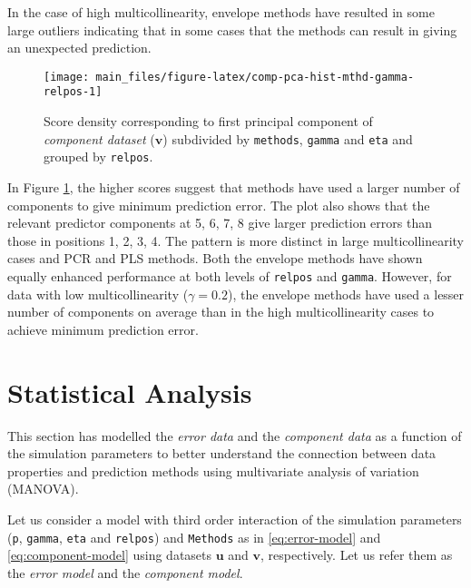 \documentclass[review]{elsarticle}
\begin{document}
In the case of high multicollinearity, envelope methods have resulted in some large outliers indicating that in some cases that the methods can result in giving an unexpected prediction.



\begin{figure}[!htb]
\texttt{[image: main\_files/figure-latex/comp-pca-hist-mthd-gamma-relpos-1]} \caption{Score density corresponding to first principal component of \emph{component dataset} (\(\mathbf{v}\)) subdivided by \texttt{methods}, \texttt{gamma} and \texttt{eta} and grouped by \texttt{relpos}.}\label{fig:comp-pca-hist-mthd-gamma-relpos}
\end{figure}

In Figure \ref{fig:comp-pca-hist-mthd-gamma-relpos}, the higher scores suggest that methods have used a larger number of components to give minimum prediction error. The plot also shows that the relevant predictor components at 5, 6, 7, 8 give larger prediction errors than those in positions 1, 2, 3, 4. The pattern is more distinct in large multicollinearity cases and PCR and PLS methods. Both the envelope methods have shown equally enhanced performance at both levels of \texttt{relpos} and \texttt{gamma}. However, for data with low multicollinearity (\(\gamma = 0.2\)), the envelope methods have used a lesser number of components on average than in the high multicollinearity cases to achieve minimum prediction error.

\hypertarget{statistical-analysis}{%
\section{Statistical Analysis}\label{statistical-analysis}}

This section has modelled the \emph{error data} and the \emph{component data} as a function of the simulation parameters to better understand the connection between data properties and prediction methods using multivariate analysis of variation (MANOVA).

Let us consider a model with third order interaction of the simulation parameters (\texttt{p}, \texttt{gamma}, \texttt{eta} and \texttt{relpos}) and \texttt{Methods} as in \eqref{eq:error-model} and \eqref{eq:component-model} using datasets \(\mathbf{u}\) and \(\mathbf{v}\), respectively. Let us refer them as the \emph{error model} and the \emph{component model}.
\end{document}
